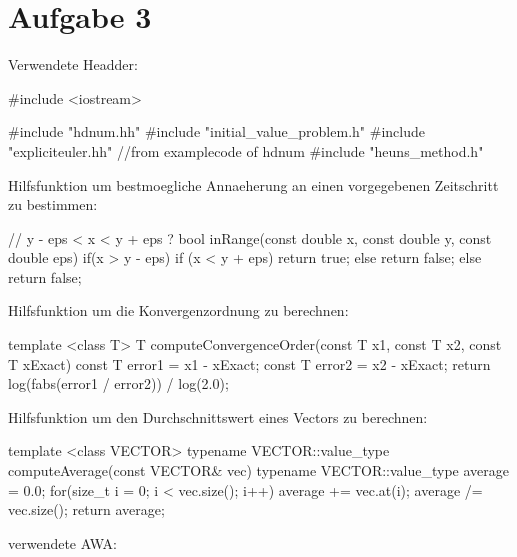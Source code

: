 \documentclass[10pt,oneside,a4paper]{scrartcl}
\begin{document}
\newpage
    \section*{Aufgabe 3}

    Verwendete Headder:
        
\begin{cppcode}
#include <iostream>

#include "hdnum.hh"
#include "initial_value_problem.h"
#include "expliciteuler.hh"          //from examplecode of hdnum
#include "heuns_method.h"
    \end{cppcode}
    
    Hilfsfunktion um bestmoegliche Annaeherung an einen vorgegebenen Zeitschritt
    zu bestimmen:
    
    \begin{cppcode}
// y - eps < x < y + eps ?
bool inRange(const double x, const double y, const double eps) {
    if(x > y - eps) {
        if (x < y + eps) {
            return true;
        } else {
            return false;
        }
    } else {
        return false;
    }
}
    \end{cppcode}
    
    Hilfsfunktion um die Konvergenzordnung zu berechnen:
    
    \begin{cppcode}
template <class T>
T computeConvergenceOrder(const T x1, const T x2, const T xExact) {
  const T error1 = x1 - xExact;
  const T error2 = x2 - xExact;
  return log(fabs(error1 / error2)) / log(2.0);
}
    \end{cppcode}
    
    Hilfsfunktion um den Durchschnittswert eines Vectors zu berechnen:
    
    \begin{cppcode}
template <class VECTOR>
typename VECTOR::value_type computeAverage(const VECTOR& vec) {
  typename VECTOR::value_type average = 0.0;
  for(size_t i = 0; i < vec.size(); i++) {
    average += vec.at(i);
  }
  average /= vec.size();
  return average;
}
    \end{cppcode}

    verwendete AWA:
    
\end{document}
